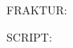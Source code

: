 \documentclass[border=1.5cm,varwidth=10cm]{standalone}
\begin{document}
\setlength{\parindent}{2em}

\noindent
{\ascii \scriptsize FRAKTUR:}

{\fraktur \lipsum[1][1-4]}

\vspace{.5cm}

\noindent
{\ascii \scriptsize SCRIPT:}

{\script \lipsum[1][1-4]}
\end{document}
